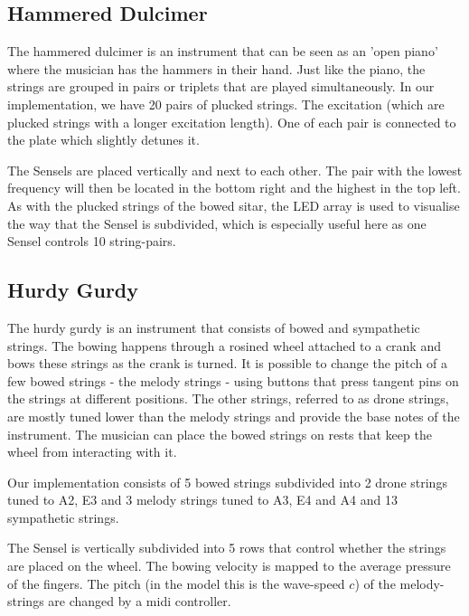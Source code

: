 \documentclass{article}
\begin{document}
\subsection{Hammered Dulcimer}
The hammered dulcimer is an instrument that can be seen as an 'open piano' where the musician has the hammers in their hand. Just like the piano, the strings are grouped in pairs or triplets
that are played simultaneously. 
In our implementation, we have 20 pairs of plucked strings. The excitation (which are plucked strings with a longer excitation length). %
One of each pair is connected to the plate which slightly detunes it.

The Sensels are placed vertically and next to each other. The pair with the lowest frequency will then be located in the bottom right and the highest in the top left. As with the plucked strings of the bowed sitar, the LED array is used to visualise the way that the Sensel is subdivided, which is especially useful here as one Sensel controls 10 string-pairs. 


\subsection{Hurdy Gurdy}
The hurdy gurdy is an instrument that consists of bowed and sympathetic strings. The bowing happens through a rosined wheel attached to a crank and bows these strings as the crank is turned. It is possible to change the pitch of a few bowed strings - the melody strings - using buttons that press tangent pins on the strings at different positions. The other strings, referred to as drone strings, are mostly tuned lower than the melody strings and provide the base notes of the instrument. The musician can place the bowed strings on rests that keep the wheel from interacting with it. 

Our implementation consists of 5 bowed strings subdivided into 2 drone strings tuned to A2, E3 and 3 melody strings tuned to A3, E4 and A4 and 13 sympathetic strings. 

The Sensel is vertically subdivided into 5 rows that control whether the strings are placed on the wheel. The bowing velocity is mapped to the average pressure of the fingers. The pitch (in the model this is the wave-speed $c$) of the melody-strings are changed by a midi controller.
\end{document}
